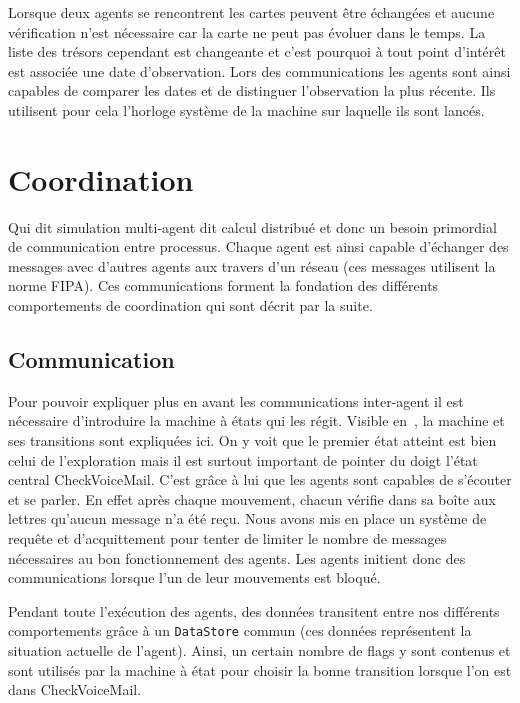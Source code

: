 \documentclass[11pt]{article}
\begin{document}
Lorsque deux agents se rencontrent les cartes peuvent être échangées et aucune vérification n'est nécessaire car la carte ne peut pas évoluer dans le temps. La liste des trésors cependant est changeante et c'est pourquoi à tout point d'intérêt est associée une date d'observation. Lors des communications les agents sont ainsi capables de comparer les dates et de distinguer l'observation la plus récente. Ils utilisent pour cela l'horloge système de la machine sur laquelle ils sont lancés.
\section{Coordination}

Qui dit simulation multi-agent dit calcul distribué et donc un besoin primordial de communication entre processus. Chaque agent est ainsi capable d'échanger des messages avec d'autres agents aux travers d'un réseau (ces messages utilisent la norme FIPA). Ces communications forment la fondation des différents comportements de coordination qui sont décrit par la suite.

\subsection{Communication}
\label{sec-comm}

Pour pouvoir expliquer plus en avant les communications inter-agent il est nécessaire d'introduire la machine à états qui les régit. Visible en~, la machine et ses transitions sont expliquées ici. On y voit que le premier état atteint est bien celui de l'exploration mais il est surtout important de pointer du doigt l'état central \textsf{CheckVoiceMail}. C'est grâce à lui que les agents sont capables de s'écouter et se parler. En effet après chaque mouvement, chacun vérifie dans sa boîte aux lettres qu'aucun message n'a été reçu. Nous avons mis en place un système de requête et d'acquittement pour tenter de limiter le nombre de messages nécessaires au bon fonctionnement des agents. Les agents initient donc des communications lorsque l'un de leur mouvements est bloqué.

Pendant toute l'exécution des agents, des données transitent entre nos différents comportements grâce à un \texttt{DataStore} commun (ces données représentent la situation actuelle de l'agent). Ainsi, un certain nombre de flags y sont contenus et sont utilisés par la machine à état pour choisir la bonne transition lorsque l'on est dans \textsf{CheckVoiceMail}. 
\end{document}
